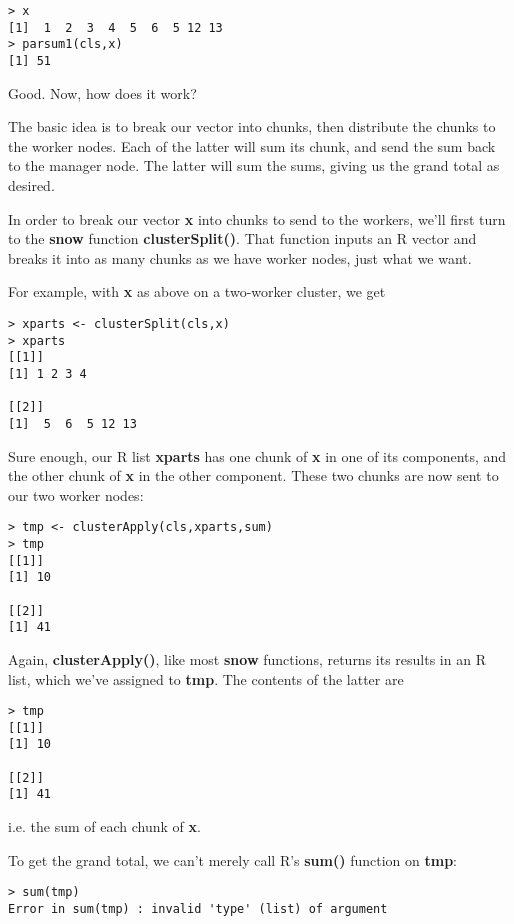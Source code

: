 \begin{lstlisting}
> x
[1]  1  2  3  4  5  6  5 12 13
> parsum1(cls,x)
[1] 51
\end{lstlisting}

Good.  Now, how does it work?

The basic idea is to break our vector into chunks, then distribute the
chunks to the worker nodes.  Each of the latter will sum its chunk, and
send the sum back to the manager node.  The latter will sum the sums,
giving us the grand total as desired.

In order to break our vector {\bf x} into chunks to send to the workers,
we'll first turn to the {\bf snow} function {\bf clusterSplit()}.  That
function inputs an R vector and breaks it into as many chunks as we have
worker nodes, just what we want.

For example, with {\bf x} as above on a two-worker cluster, we get

\begin{lstlisting}
> xparts <- clusterSplit(cls,x)
> xparts
[[1]]
[1] 1 2 3 4

[[2]]
[1]  5  6  5 12 13
\end{lstlisting}

Sure enough, our R list {\bf xparts} has one chunk of {\bf x} in one of
its components, and the other chunk of {\bf x} in the other component.
These two chunks are now sent to our two worker nodes:

\begin{lstlisting}
> tmp <- clusterApply(cls,xparts,sum)
> tmp
[[1]]
[1] 10

[[2]]
[1] 41
\end{lstlisting}

Again, {\bf clusterApply()}, like most {\bf snow} functions, returns its
results in an R list, which we've assigned to {\bf tmp}.  The contents
of the latter are

\begin{lstlisting}
> tmp
[[1]]
[1] 10

[[2]]
[1] 41
\end{lstlisting}

i.e. the sum of each chunk of {\bf x}.

To get the grand total, we can't merely call R's {\bf sum()} function on
{\bf tmp}:

\begin{lstlisting}
> sum(tmp)
Error in sum(tmp) : invalid 'type' (list) of argument
\end{lstlisting}

